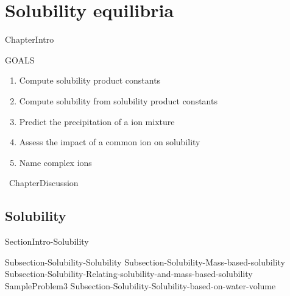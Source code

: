 \documentclass[main.tex]{subfiles}
\begin{document}
\chapter[Solubility equilibria ]{Solubility equilibria}


\begin{marginfigure}
\end{marginfigure}



   {ChapterIntro}



\begin{marginfigure}%
\begin{mytcbox}{GOALS}
\begin{enumerate}[label=\protect\circled{\color{white}\arabic*}]
\item Compute solubility product constants
\item Compute solubility from solubility product constants
\item Predict the precipitation of a ion mixture
\item Assess the impact of a common ion on solubility
\item Name complex ions
\end{enumerate}
\end{mytcbox}
\vspace{1cm}
\begin{tcolorbox}[enhanced,colback=red!5!white,colframe=black!50!red,boxrule=1pt,
  arc=0pt,outer arc=0pt,drop heavy lifted shadow]
\faGears\ 
 {ChapterDiscussion}
 \end{tcolorbox}

\end{marginfigure}%


\section{Solubility } {SectionIntro-Solubility}\sloppy\begin{description}
{Subsection-Solubility-Solubility}
{Subsection-Solubility-Mass-based-solubility}
{Subsection-Solubility-Relating-solubility-and-mass-based-solubility}
  {SampleProblem3}
{Subsection-Solubility-Solubility-based-on-water-volume}
 \end{description}
  
\end{document}
